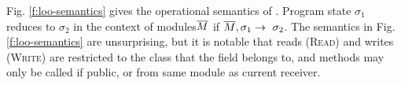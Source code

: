 Fig. \ref{f:loo-semantics} gives the operational semantics of \LangOO. 
Program state $\sigma_1$ reduces to $\sigma_2$ in the context of
modules$\overline{M}$ if $\overline{M}, \sigma_1 \rightarrow\ \sigma_2$. The semantics in Fig. \ref{f:loo-semantics}
are unsurprising, but it is notable that reads (\textsc{Read}) and writes (\textsc{Write})
are restricted to the class that the field belongs to,
{and methods  may only be called if public, or from same module as current receiver.}
\begin{figure}[t]
\begin{minipage}{\textwidth}
\begin{minipage}{\textwidth}
\footnotesize
{}
\end{minipage}
\end{minipage}
\end{figure}
